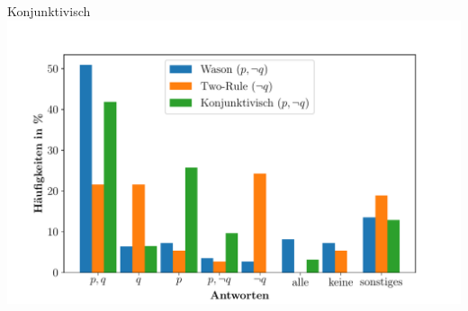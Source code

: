 \begin{frame}{Konjunktivisch {\scriptsize \cite[S.~109]{stenningHumanReasoningCognitive2008}}}
    \includegraphics[width=\textwidth]{../plot/results_subjunctive.pdf}
\end{frame}
